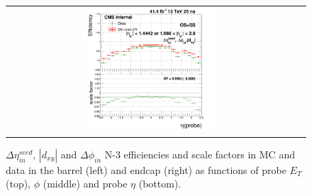 \begin{figure}[bh]
\begin{center}
\begin{tabular}{cc}
      \includegraphics[width=0.45\textwidth]{figures/Zprime/2017/ScaleFactor/SameSign/N-1/g_compare_cut_eta_Barrel+Endcap_ea_ta_inc_AS_N_3_Trk_PUW.png}
    \end{tabular}
    \caption{$\Delta \eta_{in}^{seed}$, $|d_{xy}|$ and $\Delta \phi_{in}$ N-3 efficiencies and scale factors in MC and data in the barrel (left) and endcap (right) as functions of probe $E_T$ (top), $\phi$ (middle) and probe $\eta$ (bottom).}
    \label{fig:DetaIn_Dxy_DphiIn_2017}
  \end{center}
\end{figure}
\clearpage

